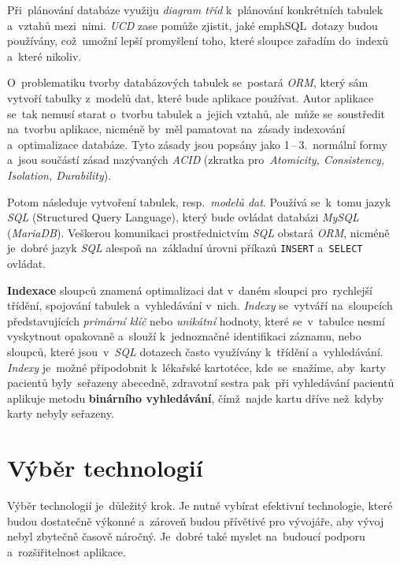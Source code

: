\documentclass[11pt,a4paper]{report}
\begin{document}
            Při~plánování databáze využiju \emph{diagram tříd} k~plánování konkrétních tabulek a~vztahů mezi~nimi. \emph{UCD} zase pomůže zjistit, jaké emph{SQL~dotazy} budou používány, což~umožní lepší promyšlení toho, které sloupce zařadím do~indexů a~které nikoliv.

            O~problematiku tvorby databázových tabulek se~postará \emph{ORM}, který sám vytvoří tabulky z~modelů dat, které bude aplikace používat. Autor aplikace se~tak nemusí starat o~tvorbu tabulek a~jejich vztahů, ale~může se~soustředit na~tvorbu aplikace, nicméně by~měl pamatovat na~zásady indexování a~optimalizace databáze. Tyto zásady jsou popsány jako 1\,--\,3.~normální formy a~jsou součástí zásad nazývaných \emph{ACID} (zkratka pro~\emph{Atomicity, Consistency, Isolation, Durability}). \cite{interval:normalniformydb, bmcACIDExplained}

            Potom následuje vytvoření tabulek, resp.~\emph{modelů dat}. Používá se~k~tomu jazyk \emph{SQL} (Structured Query Language), který bude ovládat databázi \emph{MySQL} (\emph{MariaDB}). Veškerou komunikaci prostřednictvím \emph{SQL} obstará \emph{ORM}, nicméně je~dobré jazyk \emph{SQL} alespoň na~základní úrovni příkazů \texttt{INSERT} a~\texttt{SELECT} ovládat.

            \textbf{Indexace} sloupců znamená optimalizaci dat v~daném sloupci pro~rychlejší třídění, spojování tabulek a~vyhledávání v~nich. \emph{Indexy} se~vytváří na~sloupcích představujících \emph{primární klíč} nebo \emph{unikátní} hodnoty, které se~v~tabulce nesmí vyskytnout opakovaně a~slouží k~jednoznačné identifikaci záznamu, nebo sloupců, které jsou~v~\emph{SQL} dotazech často využívány k~třídění a~vyhledávání. \emph{Indexy} je~možné připodobnit k~lékařské kartotéce, kde~se~snažíme, aby~karty pacientů byly~seřazeny abecedně, zdravotní sestra pak~při vyhledávání pacientů aplikuje metodu \textbf{binárního vyhledávání}, čímž~najde kartu dříve než~kdyby karty nebyly seřazeny. \cite{interval:normalniformydb, laurencik2018sql}

        \section{Výběr technologií}
            Výběr technologií je~důležitý krok. Je nutné vybírat efektivní technologie, které budou dostatečně výkonné a~zároveň budou přívětivé pro vývojáře, aby vývoj nebyl zbytečně časově náročný. Je~dobré také myslet na~budoucí podporu a~rozšiřitelnost aplikace.
\end{document}
